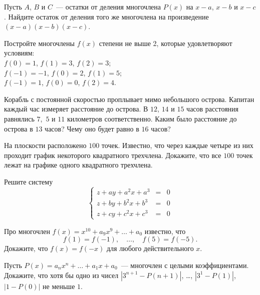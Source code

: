 \begin{problems}

\item
Пусть $A$, $B$ и $C$~--- остатки от деления многочлена $P(x)$ на
$x - a$, $x - b$ и $x - c$.
Найдите остаток от деления того же многочлена на произведение
$(x - a) (x - b) (x - c)$.

\item
Постройте многочлены $f(x)$ степени не выше 2, которые удовлетворяют условиям:
\\
\sbp $f(0) = 1$, $f(1) = 3$, $f(2) = 3$;
\\
\sbp
$f(-1) = -1$, $f(0) = 2$, $f(1) = 5$;
\\
\sbp
$f(-1) = 1$, $f(0) = 0$, $f(2) = 4$.

\item
Корабль с постоянной скоростью проплывает мимо небольшого острова.
Капитан каждый час измеряет расстояние до острова.
В $12$, $14$ и $15$ часов расстояния равнялись $7$,\ $5$ и $11$ километров
соответственно.
Каким было расстояние до острова в $13$ часов?
Чему оно будет равно в $16$ часов?


\item
На плоскости расположено $100$ точек.
Известно, что через каждые четыре из них проходит график некоторого квадратного
трехчлена.
Докажите, что все $100$ точек лежат на графике одного квадратного трехчлена.

\item
Решите систему
\[ \left\{ \begin{array}{rcl}
    z + a y + a^2 x + a^3 & = & 0
\\
    z + b y + b^2 x + b^3 & = & 0
\\
    z + c y + c^2 x + c^3 & = & 0
\end{array} \right. \]


\item
Про многочлен $f(x) = x^{10} + a_9 x^9 + \ldots + a_0$ известно, что
\[
    f(1) = f(-1)
,\quad\ldots,\quad
    f(5) = f(-5)
.\]
Докажите, что $f(x) = f(-x)$ для любого действительного $x$.

\item
Пусть $P(x) = a_n x^n + \ldots + a_1 x + a_0$~--- многочлен с целыми
коэффициентами.
Докажите, что хотя бы одно из чисел
$|3^{n+1} - P(n + 1)|$, \ldots, $|3^{1} - P(1)|$, $|1 - P(0)|$
не меньше $1$.

\end{problems}


